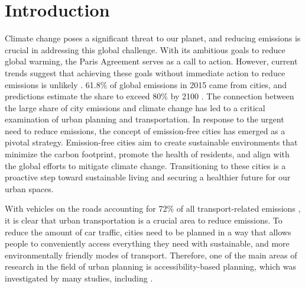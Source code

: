 \clearpage
\section{Introduction}
\label{sec:introduction}


Climate change poses a significant threat to our planet, and reducing emissions is crucial in addressing this global challenge.
With its ambitious goals to reduce global warming, the Paris Agreement serves as a call to action.
However, current trends suggest that achieving these goals without immediate action to reduce emissions is unlikely .
61.8\% of global emissions in 2015 came from cities, and predictions estimate the share to exceed 80\% by 2100 .
The connection between the large share of city emissions and climate change has led to a critical examination of urban planning and transportation.
In response to the urgent need to reduce emissions, the concept of emission-free cities has emerged as a pivotal strategy.
Emission-free cities aim to create sustainable environments that minimize the carbon footprint, promote the health of residents, and align with the global efforts to mitigate climate change.
Transitioning to these cities is a proactive step toward sustainable living and securing a healthier future for our urban spaces.


With vehicles on the roads accounting for 72\% of all transport-related emissions , it is clear that urban transportation is a crucial area to reduce emissions.
To reduce the amount of car traffic, cities need to be planned in a way that allows people to conveniently access everything they need with sustainable, and more environmentally friendly modes of transport.
Therefore, one of the main areas of research in the field of urban planning is accessibility-based planning, which was investigated by many studies, including .

